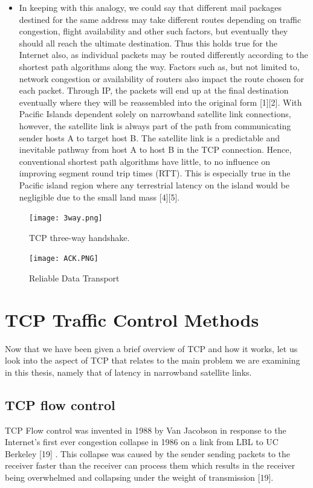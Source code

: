 \documentclass{uathesis}
\begin{document}
\begin{itemize}
\item In keeping with this analogy, we could say that different mail packages destined for the same address may take different routes depending on traffic congestion, flight availability and other such factors, but eventually they should all reach the ultimate destination. Thus this holds true for the Internet also, as individual packets may be routed differently according to the shortest path algorithms along the way. Factors such as, but not limited to, network congestion or availability of routers also impact the route chosen for each packet. Through IP, the packets will end up at the final destination eventually where they will be reassembled into the original form [1][2]. With Pacific Islands dependent solely on narrowband satellite link connections, however, the satellite link is always part of the path from communicating sender hosts A to target host B. The satellite link is a predictable and inevitable pathway from host A to host B in the TCP connection. Hence, conventional shortest path algorithms have little, to no influence on improving segment round trip times (RTT). This is especially true in the Pacific island region where any terrestrial latency on the island would be negligible due to the small land mass [4][5].

\end{itemize}

\begin{figure}[h]
    \centering
    \texttt{[image: 3way.png]}
    \caption{TCP three-way handshake. }
    \label{fig:super}
\end{figure}


\begin{figure}[h]
    \centering
    \texttt{[image: ACK.PNG]}
    \caption{Reliable Data Transport}
    \label{fig:super}
\end{figure}

\section{TCP Traffic Control Methods}
Now that we have been given a brief overview of TCP and how it works, let us look into the aspect of TCP that relates to the main problem we are examining in this thesis, namely that of latency in narrowband satellite links. 

\subsection{TCP flow control}
TCP Flow control was invented in 1988 by Van Jacobson in response to the Internet's first ever congestion collapse in 1986 on a link from LBL to UC Berkeley [19] . This collapse was caused by the sender sending packets to the receiver faster than the receiver can process them which results in the receiver being overwhelmed and collapsing under the weight of transmission [19]. \\
\end{document}
